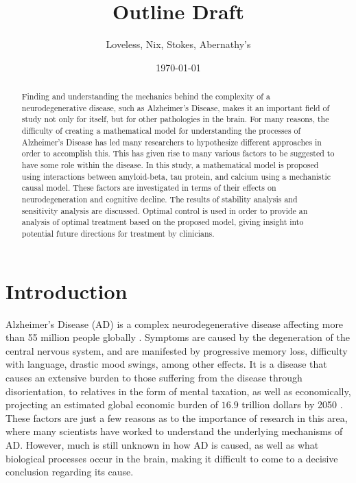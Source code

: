 \documentclass[12pt]{article}
\title{Outline Draft}
\author{Loveless, Nix, Stokes, Abernathy's}
\date{\today}
\theoremstyle{definition}
\begin{document}
\maketitle
\vspace{-2em}  %

\begin{abstract}
    Finding and understanding the mechanics behind the complexity of a neurodegenerative disease, such as Alzheimer's Disease, makes it an important field of study not only for itself, but for other pathologies in the brain. For many reasons, the difficulty of creating a mathematical model for understanding the processes of Alzheimer's Disease has led many researchers to hypothesize different approaches in order to accomplish this. This has given rise to many various factors to be suggested to have some role within the disease. In this study, a mathematical model is proposed using interactions between amyloid-beta, tau protein, and calcium using a mechanistic causal model. These factors are investigated in terms of their effects on neurodegeneration and cognitive decline. The results of stability analysis and sensitivity analysis are discussed. Optimal control is used in order to provide an analysis of optimal treatment based on the proposed model, giving insight into potential future directions for treatment by clinicians.
\end{abstract}

\section{Introduction}
Alzheimer's Disease (AD) is  a complex neurodegenerative disease affecting more than 55 million people globally \cite{maji2025mathematical}. Symptoms are caused by the degeneration of the central nervous system, and are manifested by progressive memory loss, difficulty with language, drastic mood swings, among other effects. It is a disease that causes an extensive burden to those suffering from the disease through disorientation, to relatives in the form of mental taxation, as well as economically, projecting an estimated global economic burden of $16.9$ trillion dollars by 2050 \cite{nandi2022global}. These factors are just a few reasons as to the importance of research in this area, where many scientists have worked to understand the underlying mechanisms of AD. However, much is still unknown in how AD is caused, as well as what biological processes occur in the brain, making it difficult to come to a decisive conclusion regarding its cause.
\end{document}
